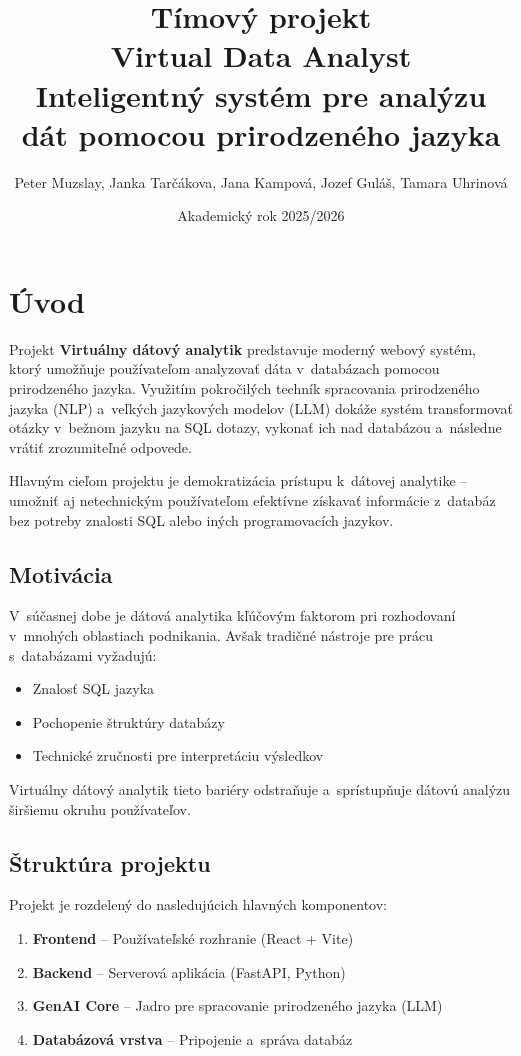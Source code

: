 \documentclass[a4paper, 12pt]{article}
\title{Tímový projekt \\ Virtual Data Analyst \\ Inteligentný systém pre analýzu dát pomocou prirodzeného jazyka}
\author{Peter Muzslay, Janka Tarčákova, Jana Kampová, Jozef Guláš, Tamara Uhrinová}
\date{Akademický rok 2025/2026}
\begin{document}
\maketitle
\clearpage
\tableofcontents
\clearpage

\section{Úvod}

Projekt \textbf{Virtuálny dátový analytik} predstavuje moderný webový systém, ktorý umožňuje používateľom analyzovať dáta v~databázach pomocou prirodzeného jazyka. Využitím pokročilých techník spracovania prirodzeného jazyka (NLP) a~veľkých jazykových modelov (LLM) dokáže systém transformovať otázky v~bežnom jazyku na SQL dotazy, vykonať ich nad databázou a~následne vrátiť zrozumiteľné odpovede.

Hlavným cieľom projektu je demokratizácia prístupu k~dátovej analytike -- umožniť aj netechnickým používateľom efektívne získavať informácie z~databáz bez potreby znalosti SQL alebo iných programovacích jazykov.

\subsection{Motivácia}

V~súčasnej dobe je dátová analytika kľúčovým faktorom pri rozhodovaní v~mnohých oblastiach podnikania. Avšak tradičné nástroje pre prácu s~databázami vyžadujú:
\begin{itemize}
    \item Znalosť SQL jazyka
    \item Pochopenie štruktúry databázy
    \item Technické zručnosti pre interpretáciu výsledkov
\end{itemize}

Virtuálny dátový analytik tieto bariéry odstraňuje a~sprístupňuje dátovú analýzu širšiemu okruhu používateľov.

\subsection{Štruktúra projektu}

Projekt je rozdelený do nasledujúcich hlavných komponentov:

\begin{enumerate}
    \item \textbf{Frontend} -- Používateľské rozhranie (React + Vite)
    \item \textbf{Backend} -- Serverová aplikácia (FastAPI, Python)
    \item \textbf{GenAI Core} -- Jadro pre spracovanie prirodzeného jazyka (LLM)
    \item \textbf{Databázová vrstva} -- Pripojenie a~správa databáz
\end{enumerate}
\end{document}
